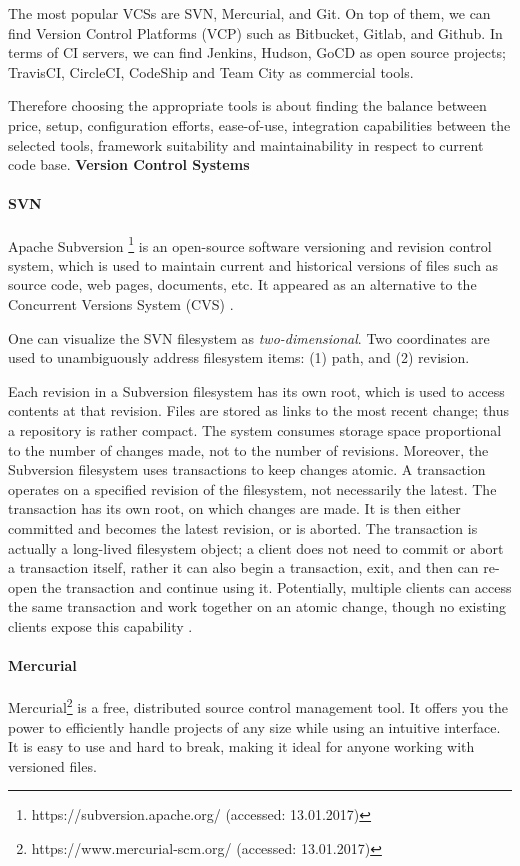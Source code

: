 The most popular VCSs are SVN, Mercurial, and Git. On top of them, we can find Version Control Platforms (VCP) such as Bitbucket, Gitlab, and Github. In terms of CI servers, we can find Jenkins, Hudson, GoCD as open source projects; TravisCI, CircleCI, CodeShip and Team City as commercial tools.

Therefore choosing the appropriate tools is about finding the balance between price, setup, configuration efforts, ease-of-use, integration capabilities between the selected tools, framework suitability and maintainability in respect to current code base.
\newpage
\textbf{Version Control Systems}

\paragraph{SVN}
Apache Subversion \footnote{https://subversion.apache.org/ (accessed: 13.01.2017)} is an open-source software versioning and revision control system, which is used to maintain current and historical versions of files such as source code, web pages, documents, etc. It appeared as an alternative to the Concurrent Versions System (CVS) \cite{Pilato2008}.

One can visualize the SVN filesystem as \emph{two-dimensional}. Two coordinates are used to unambiguously address filesystem items: (1) path, and (2) revision.

Each revision in a Subversion filesystem has its own root, which is used to access contents at that revision. Files are stored as links to the most recent change; thus a repository is rather compact. The system consumes storage space proportional to the number of changes made, not to the number of revisions. Moreover, the Subversion filesystem uses transactions to keep changes atomic. A transaction operates on a specified revision of the filesystem, not necessarily the latest. The transaction has its own root, on which changes are made. It is then either committed and becomes the latest revision, or is aborted. The transaction is actually a long-lived filesystem object; a client does not need to commit or abort a transaction itself, rather it can also begin a transaction, exit, and then can re-open the transaction and continue using it. Potentially, multiple clients can access the same transaction and work together on an atomic change, though no existing clients expose this capability \cite{Pilato2008}.
\paragraph{Mercurial}
Mercurial\footnote{https://www.mercurial-scm.org/ (accessed: 13.01.2017)} is a free, distributed source control management tool. It offers you the power to efficiently handle projects of any size while using an intuitive interface. It is easy to use and hard to break, making it ideal for anyone working with versioned files.

